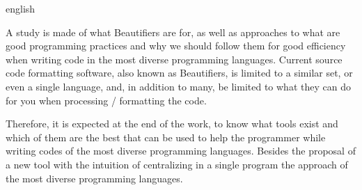 \begin{otherlanguage*}{english}
\begin{resumo}[Abstract]

    A study is made of what Beautifiers are for, as well as approaches to what are good programming
    practices and why we should follow them for good efficiency when writing code in the most
    diverse programming languages. Current source code formatting software, also known as
    Beautifiers, is limited to a similar set, or even a single language, and, in addition to many,
    be limited to what they can do for you when processing / formatting the code.

    Therefore, it is expected at the end of the work, to know what tools exist and which of them are
    the best that can be used to help the programmer while writing codes of the most diverse
    programming languages. Besides the proposal of a new tool with the intuition of centralizing in
    a single program the approach of the most diverse programming languages.


\end{resumo}
\end{otherlanguage*}











